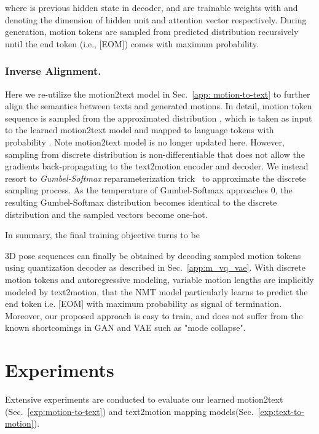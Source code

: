 \documentclass[runningheads]{llncs}
\newcommand{\beforesection}{\vspace{-2mm}}
\newcommand{\aftersection}{\vspace{-2mm}}
\newcommand{\beforesubsection}{\vspace{-2mm}}
\newcommand{\beforesubsubsection}{\vspace{-5mm}}
\begin{document}
where  is previous hidden state in decoder,  and  are trainable weights with  and  denoting the dimension of hidden unit and attention vector respectively. During generation, motion tokens are sampled from predicted distribution  recursively until the end token (i.e., [EOM]) comes with maximum probability.

\beforesubsubsection
\subsubsection{Inverse Alignment.} Here we re-utilize the motion2text model in Sec.~\ref{app: motion-to-text} to further align the semantics between texts and generated motions. In detail, motion token sequence  is sampled from the approximated distribution , which is taken as input to the learned motion2text model and mapped to language tokens  with probability . Note motion2text model is no longer updated here. However, sampling from discrete distribution is non-differentiable that does not allow the gradients back-propagating to the text2motion encoder and decoder. We instead resort to \textit{Gumbel-Softmax} reparameterization trick~\cite{jang2016categorical} to approximate the discrete sampling process. As the temperature  of Gumbel-Softmax approaches 0, the resulting Gumbel-Softmax distribution becomes identical to the discrete distribution  and the sampled vectors become one-hot.

In summary, the final training objective turns to be


3D pose sequences can finally be obtained by decoding sampled motion tokens  using quantization decoder  as described in Sec.~\ref{app:m_vq_vae}. With discrete motion tokens and autoregressive modeling, variable motion lengths are implicitly modeled by text2motion, that the NMT model particularly learns to predict the end token i.e. [EOM] with maximum probability as signal of termination. Moreover, our proposed approach is easy to train, and does not suffer from the known shortcomings in GAN and VAE such as "mode collapse".

\beforesection
\section{Experiments}
\aftersection

Extensive experiments are conducted to evaluate our learned motion2text (Sec.~\ref{exp:motion-to-text}) and text2motion mapping models(Sec.~\ref{exp:text-to-motion}).

\beforesubsection
\end{document}
